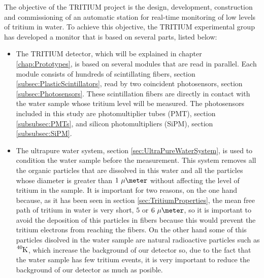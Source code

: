 The objective of the TRITIUM project is the design, development, construction and commissioning of an automatic station for real-time monitoring of low levels of tritium in water. To achieve this objective, the TRITIUM experimental group has developed a monitor that is based on several parts, listed below: 

\begin{itemize}

\item{} The TRITIUM detector, which will be explained in chapter \ref{chap:Prototypes}, is based on several modules that are read in parallel. Each module consists of hundreds of scintillating fibers, section \ref{subsec:PlasticScintillators}, read by two coincident photosensors, section \ref{subsec:Photosensors}. These scintillation fibers are directly in contact with the water sample whose tritium level will be measured. The photosensors included in this study are photomultiplier tubes (PMT), section \ref{subsubsec:PMTs}, and silicon photomultipliers (SiPM), section \ref{subsubsec:SiPM}.

\item{} The ultrapure water system, section \ref{sec:UltraPureWaterSystem}, is used to condition the water sample before the measurement. This system removes all the organic particles that are dissolved in this water and all the particles whose diameter is greater than $1~\mu\meter$ without affecting the level of tritium in the sample. It is important for two reasons, on the one hand because, as it has been seen in section \ref{sec:TritiumProperties}, the mean free path of tritium in water is very short, $5$ or $6~\mu\meter$,  so it is important to avoid the deposition of this particles in fibers because this would prevent the tritium electrons from reaching the fibers. On the other hand some of this particles disolved in the water sample are natural radioactive particles such as $\ce{^{40}K}$, which increase the background of our detector so, due to the fact that the water sample has few tritium events, it is very important to reduce the background of our detector as much as posible.


\end{itemize}
